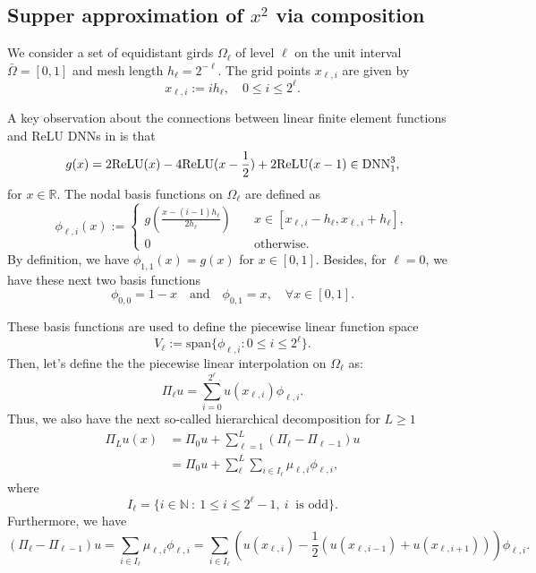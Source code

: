 \newpage
\subsection{Supper approximation of $x^2$ via composition}
We consider a set of equidistant girds $\Omega_\ell$ of level $\ell$ on the unit interval $\bar{\Omega}=[0,1]$ and mesh length $h_\ell = 2^{-\ell}$. The grid points $x_{\ell,i}$ are given by
\begin{equation}
x_{\ell,i}:=ih_\ell,\quad 0\le i\le 2^\ell.
\end{equation} 

A key observation about the connections between linear finite element functions and ReLU DNNs in \cite{he2020relu} is that
\begin{equation}\label{def_g}
g(x) = 2{\rm ReLU}(x) - 4{\rm ReLU}({x-\frac{1}{2}}) + 2{\rm ReLU}(x-1)\in {{\rm DNN}}_{1}^{3},
\end{equation}
for $x \in \mathbb{R}$. The nodal basis functions on $\Omega_\ell$ are defined as
\begin{equation}
\phi_{\ell,i}(x):=
\begin{cases}
g\left(\frac{x-(i-1)h_\ell}{2h_\ell}\right)\quad &x\in [x_{\ell,i}-h_\ell,x_{\ell,i}+h_\ell],\\
0 \quad &\text{otherwise}.
\end{cases}
\end{equation}
By definition, we have $\phi_{1,1}(x) = g(x)$ for $x \in[0,1]$. Besides, for $\ell=0$, we have these next two basis functions
\begin{equation}\label{key}
\phi_{0,0} = 1- x \quad \text{and} \quad \phi_{0,1} = x, \quad \forall x \in [0,1].
\end{equation}

These basis functions are used to define the piecewise linear function space
\begin{equation}
V_\ell :=\mbox{span}\{\phi_{\ell,i}: 0 \le i\le 2^\ell\} .
\end{equation}
Then, let's define the the piecewise linear interpolation on $\Omega_\ell$ as:
\begin{equation}
\Pi_\ell u = \sum_{i=0}^{2^\ell}u(x_{\ell,i}) \phi_{\ell,i}. 
\end{equation}
Thus, we also have the next so-called hierarchical decomposition for $L \ge 1$
\begin{equation}
\begin{aligned}
\Pi_L u(x) &=\Pi_0 u +  \sum_{\ell=1}^L  (\Pi_\ell - \Pi_{\ell-1})u \\
&=\Pi_0 u +  \sum_{\ell}^L \sum_{i\in I_\ell}\mu_{\ell,i}\phi_{\ell,i},
\end{aligned}
\end{equation}
where
\begin{equation}
I_\ell = \{i\in \mathbb{N}~:~1\le i\le 2^\ell-1, ~i ~\text{ is odd} \}.
\end{equation}
Furthermore, we have 
\begin{equation}\label{key}
(\Pi_\ell - \Pi_{\ell-1})u = \sum_{i\in I_\ell}\mu_{\ell,i}\phi_{\ell,i} = \sum_{i\in I_\ell} \left( u(x_{\ell,i}) - \frac{1}{2}\left( u(x_{\ell,i-1})  + u(x_{\ell,i+1})  \right) \right)\phi_{\ell,i}.
\end{equation}

